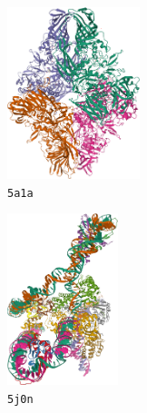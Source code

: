 
\begin{figure}[ht!]
    \centering
    \begin{minipage}[b]{0.55\linewidth}
        \centering
        \begin{subfigure}[b]{0.49\linewidth}
            \centering
            \includegraphics[height=5cm]{figures/5a1a_pdb.png}
            \caption*{\texttt{5a1a}}
        \end{subfigure}
        \hfill
        \begin{subfigure}[b]{0.42\linewidth}
            \centering
            \includegraphics[height=5cm]{figures/5j0n_pdb.png}
            \caption*{\texttt{5j0n}}
        \end{subfigure}
        \caption{%
            Ground-truth atomic models: the $\beta$-galactosidase (\texttt{5a1a}), and the lambda excision HJ intermediate (\texttt{5j0n}).
        }\label{fig:pdb-proteins}
    \end{minipage}
    \hfill
    \begin{minipage}[b]{0.35\linewidth}
        \centering
        \begin{subfigure}[b]{0.49\linewidth}
            \centering

\end{subfigure}
\end{minipage}
\end{figure}
